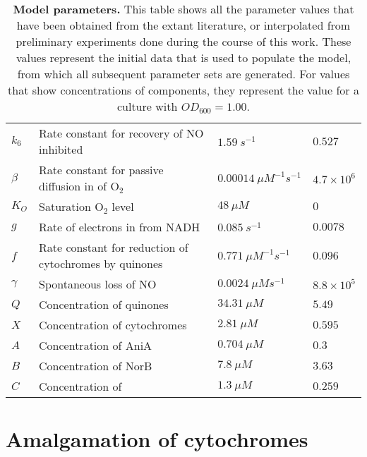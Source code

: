 \begin{table}[tbp]
\begin{center}
\begin{tabular}{>{\centering}m{1.4cm}>{\centering}m{6.1cm}>{\centering}m{2.7cm}>{\centering}m{2.5cm}}
$k_6$ & Rate constant for recovery of NO inhibited \cbbthree{} & $1.59~s^{-1}$ & $0.527$
\tabularnewline\noalign{\smallskip}\hline\noalign{\smallskip}

$\beta$ & Rate constant for passive diffusion in of O$_{\textrm{2}}$ & $0.00014~\mu M^{-1} s^{-1}$ & $4.7\times10^6$
\tabularnewline\noalign{\smallskip}\hline\noalign{\smallskip}

$K_O$ & Saturation O$_{\textrm{2}}$ level & $48~\mu M$ & $0$
\tabularnewline\noalign{\smallskip}\hline\noalign{\smallskip}

$g$ & Rate of electrons in from NADH & $0.085~s^{-1}$ & $0.0078$
\tabularnewline\noalign{\smallskip}\hline\noalign{\smallskip}

$f$ & Rate constant for reduction of cytochromes by quinones & $0.771~\mu M^{-1}s^{-1}$ & $0.096$
\tabularnewline\noalign{\smallskip}\hline\noalign{\smallskip}

$\gamma$ & Spontaneous loss of NO & $0.0024~\mu Ms^{-1}$ & $8.8\times10^5$
\tabularnewline\noalign{\smallskip}\hline\noalign{\smallskip}

$Q$ & Concentration of quinones & $34.31~\mu M$ & $5.49$
\tabularnewline\noalign{\smallskip}\hline\noalign{\smallskip}

$X$ & Concentration of cytochromes & $2.81~\mu M$ & $0.595$
\tabularnewline\noalign{\smallskip}\hline\noalign{\smallskip}

$A$ & Concentration of AniA & $0.704~\mu M$ & $0.3$
\tabularnewline\noalign{\smallskip}\hline\noalign{\smallskip}

$B$ & Concentration of NorB & $7.8~\mu M$ & $3.63$
\tabularnewline\noalign{\smallskip}\hline\noalign{\smallskip}

$C$ & Concentration of \cbbthree{} & $1.3~\mu M$ & $0.259$
\tabularnewline
\bottomrule
\end{tabular}
\caption[Model parameters]{{\bf Model parameters.} This table shows all the parameter values that have been obtained from the extant literature, or interpolated from preliminary experiments done during the course of this work. These values represent the initial data that is used to populate the model, from which all subsequent parameter sets are generated. For values that show concentrations of components, they represent the value for a culture with $OD_{600}=1.00$.
\label{tab:final_parameters}}
\end{center}
\end{table}

\section{Amalgamation of cytochromes}